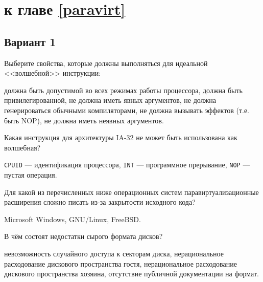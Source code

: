 
\section{\Questions к главе \ref{paravirt}} %

\subsection*{Вариант 1}

\begin{questions}

\question[3] Выберите свойства, которые должны выполняться для идеальной <<волшебной>> инструкции:
\begin{choices}
    \correctchoice должна быть допустимой во всех режимах работы процессора,
    \choice должна быть привилегированной,
    \choice не должна иметь явных аргументов,
    \correctchoice не должна генерироваться обычными компиляторами,
    \correctchoice не должна вызывать эффектов (т.е. быть NOP),
    \choice не должна иметь неявных аргументов.
\end{choices}

\question[3] Какая инструкция для архитектуры IA-32 не может быть использована как волшебная?
\begin{choices}
\choice \texttt{CPUID} — идентификация процессора,
\correctchoice \texttt{INT} — программное прерывание,
\choice \texttt{NOP} — пустая операция.
\end{choices}

\question[3] Для какой из перечисленных ниже операционных систем паравиртуализационные расширения сложно писать из-за закрытости исходного кода?
\begin{choices}
\correctchoice Microsoft Windows,
\choice GNU/Linux,
\choice FreeBSD.
\end{choices}

\question[3] В чём состоят недостатки сырого формата дисков?
\begin{choices}
\choice невозможность случайного доступа к секторам диска,
\choice нерациональное расходование дискового пространства гостя,
\correctchoice нерациональное расходование дискового пространства хозяина,
\choice отсутствие публичной документации на формат.
\end{choices}

\end{questions}

